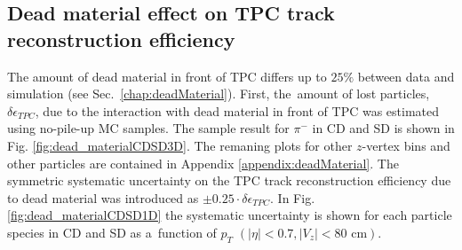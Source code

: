 \subsection{Dead material effect on TPC track reconstruction efficiency}\label{sec:deadMaterialSystematics}
The amount of dead material in front of TPC differs up to $25\%$ between data and simulation (see Sec.~\ref{chap:deadMaterial}). First, the~amount of lost particles, $\delta\epsilon_{ TPC}$, due to the interaction with dead material in front of TPC was estimated using  no-pile-up  MC samples. The sample result for $\pi^-$ in CD and SD is shown in Fig. \ref{fig:dead_materialCDSD3D}. The remaning plots for other $z$-vertex bins and other particles are contained  in Appendix \ref{appendix:deadMaterial}.
The symmetric systematic uncertainty on the TPC track reconstruction efficiency due to dead material was introduced as $\pm 0.25 \cdot\delta\epsilon_{ TPC}$.
In Fig. \ref{fig:dead_materialCDSD1D}  the systematic uncertainty is shown for each particle species in CD and SD as a~function of $p_T$ $\left(|\eta|<0.7, |V_{z}|<80 \text{ cm}\right)$. 

